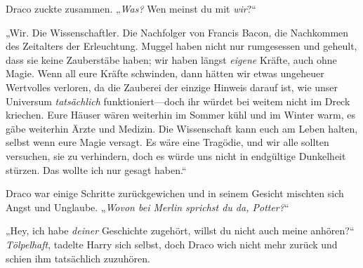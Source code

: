 Draco zuckte zusammen. „\emph{Was?} Wen meinst du mit \emph{wir}?“

„Wir. Die Wissenschaftler. Die Nachfolger von Francis Bacon, die Nachkommen des Zeitalters der Erleuchtung. Muggel haben nicht nur rumgesessen und geheult, dass sie keine Zauberstäbe haben; wir haben längst \emph{eigene} Kräfte, auch ohne Magie. Wenn all eure Kräfte schwinden, dann hätten wir etwas ungeheuer Wertvolles verloren, da die Zauberei der einzige Hinweis darauf ist, wie unser Universum \emph{tatsächlich} funktioniert—doch ihr würdet bei weitem nicht im Dreck kriechen. Eure Häuser wären weiterhin im Sommer kühl und im Winter warm, es gäbe weiterhin Ärzte und Medizin. Die Wissenschaft kann euch am Leben halten, selbst wenn eure Magie versagt. Es wäre eine Tragödie, und wir alle sollten versuchen, sie zu verhindern, doch es würde uns nicht in endgültige Dunkelheit stürzen. Das wollte ich nur gesagt haben.“

Draco war einige Schritte zurückgewichen und in seinem Gesicht mischten sich Angst und Unglaube. „\emph{Wovon bei Merlin sprichst du da, Potter?}“

„Hey, ich habe \emph{deiner} Geschichte zugehört, willst du nicht auch meine anhören?“ \emph{Tölpelhaft}, tadelte Harry sich selbst, doch Draco wich nicht mehr zurück und schien ihm tatsächlich zuzuhören.

